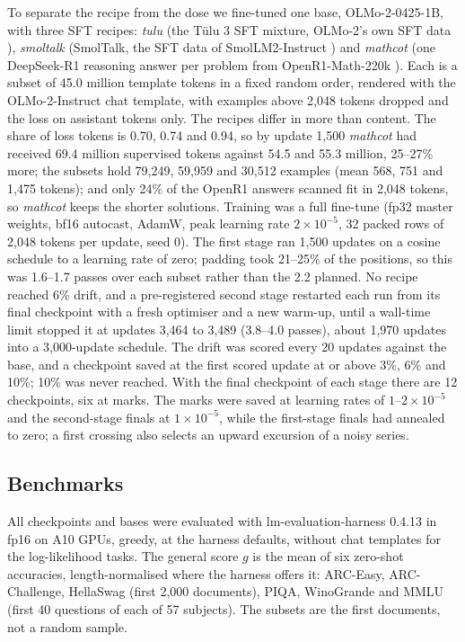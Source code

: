 \documentclass[11pt,a4paper]{article}
\theoremstyle{definition}
\newcommand{\tulu}{\textit{tulu}}
\newcommand{\smoltalk}{\textit{smoltalk}}
\newcommand{\mathcot}{\textit{mathcot}}
\begin{document}
To separate the recipe from the dose we fine-tuned one base, OLMo-2-0425-1B, with three SFT recipes:
\tulu{} (the T\"ulu 3 SFT mixture, OLMo-2's own SFT data \citep{lambert2024tulu3}), \smoltalk{} (SmolTalk, the
SFT data of SmolLM2-Instruct \citep{benallal2025smollm2}) and \mathcot{} (one DeepSeek-R1 reasoning answer per
problem from OpenR1-Math-220k \citep{openr1math2025,deepseek2025r1}). Each is a subset of 45.0 million template
tokens in a fixed random order, rendered with the OLMo-2-Instruct chat template, with examples above 2,048 tokens
dropped and the loss on assistant tokens only. The recipes differ in more than content. The share of loss tokens
is 0.70, 0.74 and 0.94, so by update 1,500 \mathcot{} had received 69.4 million supervised tokens against 54.5 and
55.3 million, 25--27\% more; the subsets hold 79,249, 59,959 and 30,512 examples (mean 568, 751 and 1,475 tokens);
and only 24\% of the OpenR1 answers scanned fit in 2,048 tokens, so \mathcot{} keeps the shorter solutions.
Training was a full fine-tune (fp32 master weights, bf16 autocast, AdamW, peak learning rate $2\times10^{-5}$, 32
packed rows of 2,048 tokens per update, seed 0). The first stage ran 1,500 updates on a cosine schedule to a
learning rate of zero; padding took 21--25\% of the positions, so this was 1.6--1.7 passes over each subset
rather than the 2.2 planned. No recipe reached 6\% drift, and a pre-registered second stage restarted each run
from its final checkpoint with a fresh optimiser and a new warm-up, until a wall-time limit stopped it at updates
3,464 to 3,489 (3.8--4.0 passes), about 1,970 updates into a 3,000-update schedule. The drift was scored every 20
updates against the base, and a checkpoint saved at the first scored update at or above 3\%, 6\% and 10\%; 10\% was
never reached. With the final checkpoint of each stage there are 12 checkpoints, six at marks. The marks were
saved at learning rates of $1$--$2\times10^{-5}$ and the second-stage finals at $1\times10^{-5}$, while the
first-stage finals had annealed to zero; a first crossing also selects an upward excursion of a noisy series.

\subsection{Benchmarks}
\label{sec:bench}

All checkpoints and bases were evaluated with lm-evaluation-harness 0.4.13 \citep{gao2024harness} in fp16 on A10
GPUs, greedy, at the harness defaults, without chat templates for the log-likelihood tasks. The general score
$g$ is the mean of six zero-shot accuracies, length-normalised where the harness offers it: ARC-Easy,
ARC-Challenge, HellaSwag (first 2,000 documents), PIQA, WinoGrande and MMLU (first 40 questions of each of 57
subjects). The subsets are the first documents, not a random sample.
\end{document}
